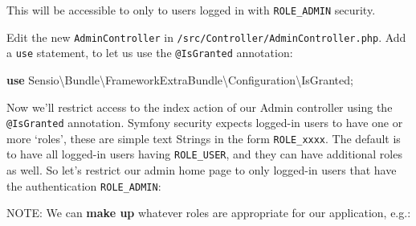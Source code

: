\documentclass[a4paperpaper,openright]{book}
\newenvironment{Shaded}{}{}
\newcommand{\AnnotationTok}[1]{\textcolor[rgb]{0.38,0.63,0.69}{\textbf{\textit{#1}}}}
\newcommand{\CommentTok}[1]{\textcolor[rgb]{0.38,0.63,0.69}{\textit{#1}}}
\newcommand{\ExtensionTok}[1]{#1}
\newcommand{\KeywordTok}[1]{\textcolor[rgb]{0.00,0.44,0.13}{\textbf{#1}}}
\newcommand{\NormalTok}[1]{#1}
\newcommand{\OtherTok}[1]{\textcolor[rgb]{0.00,0.44,0.13}{#1}}
\newcommand{\StringTok}[1]{\textcolor[rgb]{0.25,0.44,0.63}{#1}}
\begin{document}
\begin{Shaded}
\end{Shaded}

This will be accessible to only to users logged in with
\texttt{ROLE\_ADMIN} security.

Edit the new \texttt{AdminController} in
\texttt{/src/Controller/AdminController.php}. Add a \texttt{use}
statement, to let us use the \texttt{@IsGranted} annotation:

\begin{Shaded}
\begin{Highlighting}[]
    \KeywordTok{use}\NormalTok{ Sensio\textbackslash{}Bundle\textbackslash{}FrameworkExtraBundle\textbackslash{}Configuration\textbackslash{}IsGranted}\OtherTok{;}
\end{Highlighting}
\end{Shaded}

Now we'll restrict access to the index action of our Admin controller
using the \texttt{@IsGranted} annotation. Symfony security expects
logged-in users to have one or more `roles', these are simple text
Strings in the form \texttt{ROLE\_xxxx}. The default is to have all
logged-in users having \texttt{ROLE\_USER}, and they can have additional
roles as well. So let's restrict our admin home page to only logged-in
users that have the authentication \texttt{ROLE\_ADMIN}:

\begin{Shaded}
\end{Shaded}

NOTE: We can \textbf{make up} whatever roles are appropriate for our
application, e.g.:
\end{document}
